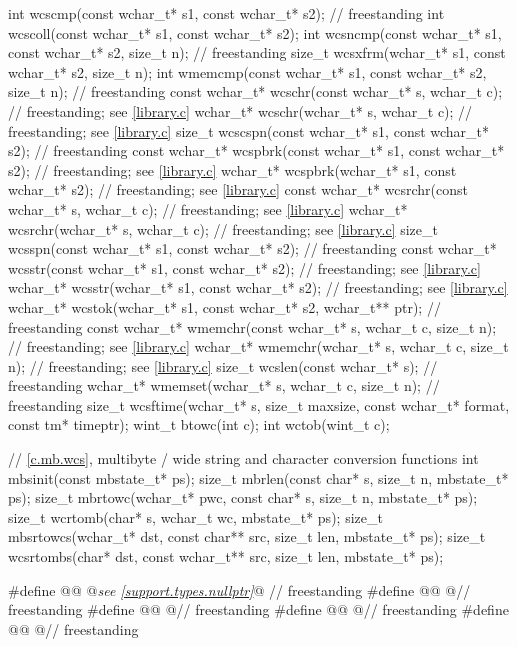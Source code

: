 \begin{codeblock}
{  int wcscmp(const wchar_t* s1, const wchar_t* s2);                     // freestanding
  int wcscoll(const wchar_t* s1, const wchar_t* s2);
  int wcsncmp(const wchar_t* s1, const wchar_t* s2, size_t n);          // freestanding
  size_t wcsxfrm(wchar_t* s1, const wchar_t* s2, size_t n);
  int wmemcmp(const wchar_t* s1, const wchar_t* s2, size_t n);          // freestanding
  const wchar_t* wcschr(const wchar_t* s, wchar_t c);                   // freestanding; see \ref{library.c}
  wchar_t* wcschr(wchar_t* s, wchar_t c);                               // freestanding; see \ref{library.c}
  size_t wcscspn(const wchar_t* s1, const wchar_t* s2);                 // freestanding
  const wchar_t* wcspbrk(const wchar_t* s1, const wchar_t* s2);         // freestanding; see \ref{library.c}
  wchar_t* wcspbrk(wchar_t* s1, const wchar_t* s2);                     // freestanding; see \ref{library.c}
  const wchar_t* wcsrchr(const wchar_t* s, wchar_t c);                  // freestanding; see \ref{library.c}
  wchar_t* wcsrchr(wchar_t* s, wchar_t c);                              // freestanding; see \ref{library.c}
  size_t wcsspn(const wchar_t* s1, const wchar_t* s2);                  // freestanding
  const wchar_t* wcsstr(const wchar_t* s1, const wchar_t* s2);          // freestanding; see \ref{library.c}
  wchar_t* wcsstr(wchar_t* s1, const wchar_t* s2);                      // freestanding; see \ref{library.c}
  wchar_t* wcstok(wchar_t* s1, const wchar_t* s2, wchar_t** ptr);       // freestanding
  const wchar_t* wmemchr(const wchar_t* s, wchar_t c, size_t n);        // freestanding; see \ref{library.c}
  wchar_t* wmemchr(wchar_t* s, wchar_t c, size_t n);                    // freestanding; see \ref{library.c}
  size_t wcslen(const wchar_t* s);                                      // freestanding
  wchar_t* wmemset(wchar_t* s, wchar_t c, size_t n);                    // freestanding
  size_t wcsftime(wchar_t* s, size_t maxsize, const wchar_t* format, const tm* timeptr);
  wint_t btowc(int c);
  int wctob(wint_t c);

  // \ref{c.mb.wcs}, multibyte / wide string and character conversion functions
  int mbsinit(const mbstate_t* ps);
  size_t mbrlen(const char* s, size_t n, mbstate_t* ps);
  size_t mbrtowc(wchar_t* pwc, const char* s, size_t n, mbstate_t* ps);
  size_t wcrtomb(char* s, wchar_t wc, mbstate_t* ps);
  size_t mbsrtowcs(wchar_t* dst, const char** src, size_t len, mbstate_t* ps);
  size_t wcsrtombs(char* dst, const wchar_t** src, size_t len, mbstate_t* ps);
}

#define @@ @\textit{see \ref{support.types.nullptr}}@                                                  // freestanding
#define @@ @\seebelow@                                             // freestanding
#define @@ @\seebelow@                                             // freestanding
#define @@ @\seebelow@                                                  // freestanding
#define @@ @\seebelow@                                           // freestanding
\end{codeblock}

